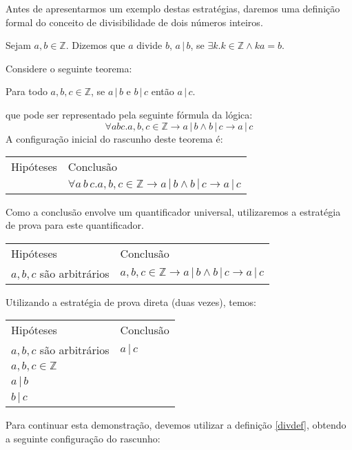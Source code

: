 Antes de apresentarmos um exemplo destas estratégias, daremos uma definição formal do
conceito de divisibilidade de dois números inteiros.

\begin{Definition}[Divisibilidade]\label{divdef}
Sejam $a,b\in\mathbb{Z}$. Dizemos que $a$ divide $b$, $a\,|\,b$, se
$\exists k. k\in\mathbb{Z}\land ka = b$.
\end{Definition}
\begin{Example}
Considere o seguinte teorema:
\begin{flushleft}
Para todo $a, b, c\in\mathbb{Z}$, se $a\,|\,b$ e $b\,|\,c$ então $a\,|\,c$.
\end{flushleft}
que pode ser representado pela seguinte fórmula da lógica:
\[
\forall a b c. a,b,c\in\mathbb{Z} \to a\,|\,b \land b\,|\,c \to a
\,|\, c
\]
A configuração inicial do rascunho deste teorema é:
\begin{flushleft}
\begin{tabular}{ll}
Hipóteses & Conclusão \\
& $\forall a\, b \,c. a,b,c\in\mathbb{Z} \to a\,|\,b \land b\,|\,c \to a
\,|\, c$
\end{tabular}
\end{flushleft}
Como a conclusão envolve um quantificador universal, utilizaremos a
estratégia de prova para este quantificador.
\begin{flushleft}
\begin{tabular}{ll}
Hipóteses & Conclusão \\
$a,b,c$ são arbitrários& $a,b,c\in\mathbb{Z} \to a\,|\,b \land b\,|\,c \to a
\,|\, c$
\end{tabular}
\end{flushleft}
Utilizando a estratégia de prova direta (duas vezes), temos:
\begin{flushleft}
\begin{tabular}{ll}
Hipóteses & Conclusão \\
$a,b,c$ são arbitrários& $ a\,|\, c$\\
$a,b,c\in\mathbb{Z}$ & \\
$a\,|\,b$ & \\
$b\,|\,c$ & \\
\end{tabular}
\end{flushleft}
Para continuar esta demonstração, devemos utilizar a definição
\ref{divdef}, obtendo a seguinte configuração do rascunho:
\begin{flushleft}
\begin{tabular}{ll}

\end{tabular}
\end{flushleft}
\end{Example}
